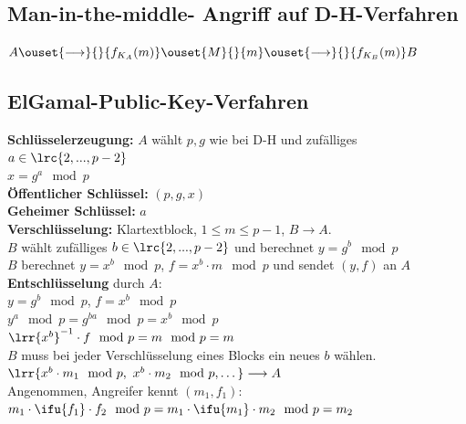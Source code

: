 	\subsection{Man-in-the-middle- Angriff auf D-H-Verfahren}

		$A\ouset{\longrightarrow}{}{f_{K_A}(m)}\ouset{M}{}{m}
  \ouset{\longrightarrow}{}{f_{K_B}(m)} B$

	\subsection{ElGamal-Public-Key-Verfahren}
		\textbf{Schlüsselerzeugung:} $A$ wählt $p,g$ wie bei D-H und zufälliges $a\in\lrc{2,...,p-2}$\\
		$x=g^a\mod p$\\
		\textbf{Öffentlicher Schlüssel:} $(p,g,x)$\\
		\textbf{Geheimer Schlüssel:} $a$\\
		\textbf{Verschlüsselung:} Klartextblock, $1\leq m\leq p-1$, $B\rightarrow A$.\\
		$B$ wählt zufälliges $b\in\lrc{2,...,p-2}$ und berechnet $y=g^b\mod p$\\
		$B$ berechnet $y=x^b\mod p$, $f=x^b\cdot m\mod p$ und sendet $(y,f)$ an $A$\\
		\textbf{Entschlüsselung} durch $A$:\\
		$y=g^b\mod p$, $f=x^b\mod p$\\
		$y^a\mod p=g^{ba}\mod p=x^b\mod p$\\
		$\lrr{x^b}^{-1}\cdot f\mod p=m\mod p=m$\\
		$B$ muss bei jeder Verschlüsselung eines Blocks ein neues $b$ wählen.\\
		$\lrr{x^b\cdot m_1\mod p,\ x^b\cdot m_2\mod p, \dots}\longrightarrow A$\\
		Angenommen, Angreifer kennt $(m_1,f_1)$:\\
		$m_1\cdot\ifu{f_1}\cdot f_2\mod p=m_1\cdot\ifu{m_1}\cdot m_2\mod p=m_2$
\newpage
